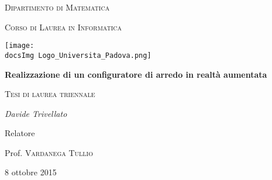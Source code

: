 \begin{titlepage}
	\centering
	{\scshape\LARGE Dipartimento di Matematica \par}
	\vspace{1cm}
	{\scshape\Large Corso di Laurea in Informatica\par}
	\vspace{1.5cm}
	
	\texttt{[image: \\docsImg Logo\_Universita\_Padova.png]}
	\vspace{1cm}
	
	{\huge\bfseries Realizzazione di un configuratore di arredo in realtà aumentata \par}
	\vspace{0.5cm}
	{\scshape\Large Tesi di laurea triennale\par}
	\vspace{1.5cm}
	
	{\Large\itshape Davide Trivellato\par}
	\vfill
	Relatore\par
	Prof. \textsc{Vardanega Tullio}
	
	\vfill
	
	{\large 8 ottobre 2015\par}
\end{titlepage}